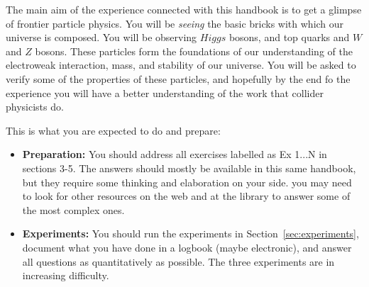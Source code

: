 
The main aim of the experience connected with this handbook is to get a glimpse of frontier particle physics. You will be \textit{seeing} the basic bricks with which our universe is composed. You will be observing $Higgs$ bosons, and top quarks and $W$ and $Z$ bosons. These particles form the foundations of our understanding of the electroweak interaction, mass, and stability of our universe. You will be asked to verify some of the properties of these particles, and hopefully by the end fo the experience you will have a better understanding of the work that collider physicists do. 

This is what you are expected to do and prepare: 

\begin{itemize}
\item{\textbf{Preparation:}} You should address all exercises labelled as Ex 1...N in sections 3-5. The answers should mostly be available in this same handbook, but they require some thinking and elaboration on your side. you may need to look for other resources on the web and at the library to answer some of the most complex ones. 
\item{\textbf{Experiments:}} You should run the experiments in Section~\ref{sec:experiments}, document what you have done in a logbook (maybe electronic), and answer all questions as quantitatively as possible. The three experiments are in increasing difficulty. 
\end{itemize} 

